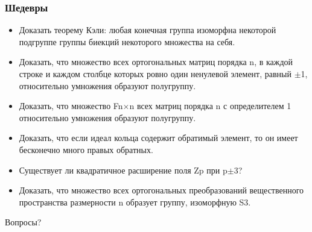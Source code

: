 \documentclass[10pt, pdf,utf8,russian]{beamer}
\begin{document}
\begin{frame}
	\frametitle{Шедевры}
	\begin{itemize}
		\item Доказать теорему Кэли: любая конечная группа изоморфна некоторой подгруппе группы биекций некоторого множества на себя.
		\item Доказать, что множество всех ортогональных матриц порядка n, в каждой строке и каждом столбце которых ровно один ненулевой элемент, равный $\pm$1, относительно умножения образуют полугруппу.
		\item Доказать, что множество Fn$\times$n всех матриц порядка n с определителем 1 относительно умножения образуют полугруппу.
		\item Доказать, что если идеал кольца содержит обратимый элемент, то он имеет бесконечно много правых обратных.
		\item Существует ли квадратичное расширение поля Zp при p$\pm$3?
		\item Доказать, что множество всех ортогональных преобразований вещественного пространства размерности n образует группу, изоморфную S3.
	\end{itemize}
\end{frame}


\begin{frame}
\Huge{\centerline{Вопросы?}}
\end{frame}

\end{document}
